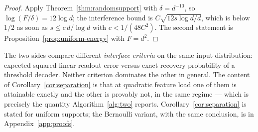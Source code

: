 \begin{proof}
Apply Theorem~\ref{thm:randomsupport} with $\delta=d^{-10}$, so $\log(F/\delta)=12\log d$; the
interference bound is $C\sqrt{12s\log d/d}$, which is below $1/2$ as soon as
$s\le c\,d/\log d$ with $c<1/(48C^2)$. The second statement is
Proposition~\ref{prop:uniform-energy} with $F=d^2$.
\end{proof}

\begin{remark}
\label{rem:criteria}
The two sides compare different \emph{interface criteria} on the same input distribution:
expected squared linear readout error versus exact-recovery probability of a threshold
decoder. Neither criterion dominates the other in general. The content of
Corollary~\ref{cor:separation} is that at quadratic feature load one of them is attainable
exactly and the other is provably not, in the same regime --- which is precisely the quantity
Algorithm~\ref{alg:two} reports. Corollary~\ref{cor:separation} is stated for uniform supports;
the Bernoulli variant, with the same conclusion, is in Appendix~\ref{app:proofs}.
\end{remark}

